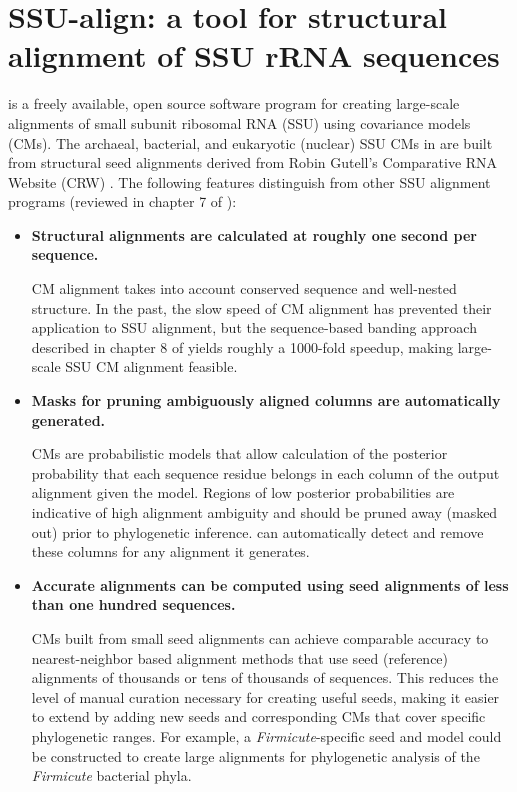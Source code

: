 \section{SSU-align: a tool for structural alignment of SSU
  rRNA sequences}
\label{section:chap9}

 is a freely available, open source software program
for creating large-scale alignments of small subunit ribosomal RNA
(SSU) using covariance models (CMs). The archaeal, bacterial,
and eukaryotic (nuclear) 
SSU CMs in  are built from structural seed alignments derived from
Robin Gutell's Comparative RNA Website (CRW) \cite{CannoneGutell02}.
The following features distinguish  from other
SSU alignment programs (reviewed in chapter 7 of \cite{Nawrocki09b}):

\begin{itemize}

\item \textbf{Structural alignments are calculated at roughly one
  second per sequence.}  

  CM alignment takes into account conserved sequence and well-nested
  structure. In the past, the slow speed of CM alignment has prevented
  their application to SSU alignment, but the sequence-based banding
  approach described in chapter 8 of \cite{Nawrocki09b} yields roughly a 1000-fold speedup,
  making large-scale SSU CM alignment feasible.

\item \textbf{Masks for pruning ambiguously aligned columns are
  automatically generated.}
  
  CMs are probabilistic models that allow calculation of the posterior
  probability that each sequence residue belongs in each column of the
  output alignment given the model. Regions of low posterior
  probabilities are indicative of high alignment ambiguity and
  should be pruned away (masked out) prior to phylogenetic
  inference.  can automatically detect and remove
  these columns for any alignment it generates.

\item \textbf{Accurate alignments can be computed using seed
  alignments of less than one hundred sequences.}

  CMs built from small seed alignments %
  can achieve comparable accuracy to nearest-neighbor based alignment
  methods that use seed (reference) alignments of thousands or tens of
  thousands of sequences. This reduces the level of manual curation
  necessary for creating useful seeds, making it easier to extend
   by adding new seeds and corresponding CMs that cover
  specific phylogenetic ranges. For example, a
  \emph{Firmicute}-specific seed and model could be constructed to
  create large alignments for phylogenetic analysis of the \emph{Firmicute}
  bacterial phyla.

\end{itemize}

